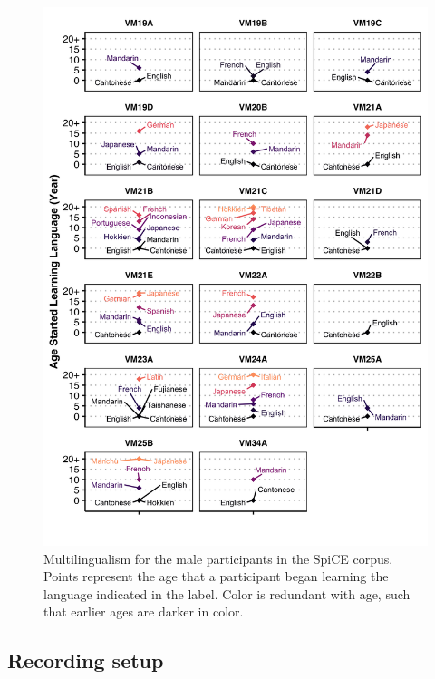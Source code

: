 \begin{figure}[!htbp]
  \begin{center}
  \includegraphics[width=4.5in]{figures/ch2_multilingualism_vm_5in.png} 
  \caption{Multilingualism for the male participants in the SpiCE corpus. Points represent the age that a participant began learning the language indicated in the label. Color is redundant with age, such that earlier ages are darker in color.}
  \label{ch2:fig:multilingualism_vm}
  \end{center}
\end{figure}

\subsection{Recording setup}\label{ch2:subsec:setup}

